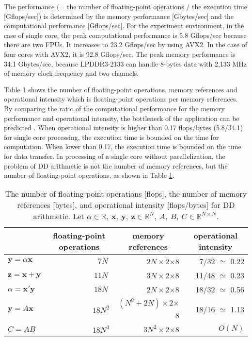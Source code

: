\documentclass{IOS-Book-Article}
\begin{document}
The performance (= the number of floating-point operations / the execution time [Gflops/sec]) is determined by the memory performance [Gbytes/sec] and the computational performance [Gflops/sec].
For the experiment environment, in the case of single core, the peak computational performance is 5.8 Gflops/sec because there are two FPUs. It increases to 23.2 Gflops/sec by using AVX2. In the case of four cores with AVX2, it is 92.8 Gflops/sec.
The peak memory performance is 34.1 Gbytes/sec, because LPDDR3-2133 can handle 8-bytes data with 2,133 MHz of memory clock frequency and two channels. 

Table \ref{opeData} shows the number of floating-point operations, memory references and operational intensity \cite{roof} which is floating-point operations per memory references. By comparing the ratio of the computational performance for the memory performance and operational intensity, the bottleneck of the application can be predicted \cite{roof}. When operational intensity is higher than 0.17 flops/bytes (5.8/34.1) for single core processing, the execution time is bounded on the time for computation. When lower than 0.17, the execution time is bounded on the time for data transfer. 
In processing of a single core without parallelization, the problem of DD arithmetic is not the number of memory references, but the number of floating-point operations, as shown in Table \ref{opeData}.

\begin{table}[htbp]
\centering
\footnotesize
\caption{The number of floating-point operations [flops], the number of memory references [bytes], and operational intensity [flops/bytes] for DD arithmetic. Let $ \alpha \in \mathbb{R},\ \bm{x},\ \bm{y},\ \bm{z}\in \mathbb{R}^{N},\ A,\ B,\ C \in \mathbb{R}^{N\times N}$.}
\label{opeData}
\begin{tabular}{l||r|r|r}
\hline
    & \multicolumn{1}{c}{floating-point operations}   & \multicolumn{1}{|c|}{memory references}  & \multicolumn{1}{c}{operational intensity}                                    \\ \hline \hline
$\bm{y} = \alpha\bm{x}$ & $7N^{\ } $     & $2N \times 2$$\times$8      &7/32  $ \simeq$	0.22       \\ \hline
$\bm{z} = \bm{x} + \bm{y}$ & $11N^{\ } $     & $3N \times 2$$\times$8   &11/48  $\simeq$	0.23            \\ \hline
$\alpha  = \bm{x}'\bm{y}$& $18N^{\ }$    &$ 2N  \times 2$$\times$8           &18/32  $\simeq$	0.56          \\ \hline
$\bm{y} = A\bm{x}$ & $18N^2$ &$ (N^2+2N) \times 2$$\times$8 &18/16 $\simeq$	1.13 \\ \hline
$C = AB$  & $18N^3$  & $3N^2 \times 2$$\times$8    &$O(N)$\\ \hline
\end{tabular}
\end{table}
\end{document}
